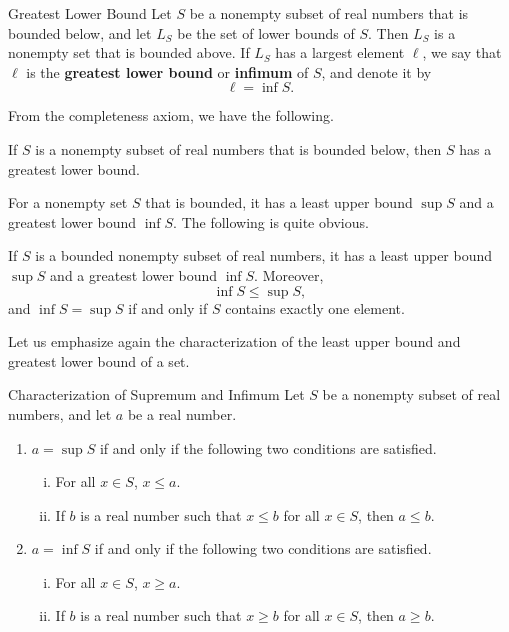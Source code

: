 \begin{definition}{Greatest Lower Bound}
Let $S$ be a nonempty subset of real numbers
 that is bounded below, and let $L_S$ be the set of lower bounds of $S$. Then $L_S$ is a nonempty set that is bounded above. If $L_S$ has a largest element $\ell$, we say that $\ell$ is the {\bf greatest lower bound} or {\bf infimum} of $S$, and denote it by
\[\ell=\inf S.\]
 

\end{definition}

From the completeness axiom, we have the following.
\begin{theorem}{}
If $S$ is a nonempty subset of real numbers
 that is bounded below, then $S$ has a greatest lower bound.
\end{theorem}

For a nonempty set $S$ that is bounded, it has a least upper bound $\sup S$ and a greatest lower bound $\inf S$. The following is quite obvious.

\begin{proposition}{}
If $S$ is a bounded nonempty subset of real numbers, it has a least upper bound $\sup S$ and a greatest lower bound $\inf S$. Moreover,
\[\inf S\leq \sup S,\]
and $\inf S=\sup S$ if and only if $S$ contains exactly one element.
\end{proposition}


Let us emphasize again the characterization of the least upper bound and greatest lower bound of a set.
\begin{highlight}{Characterization of Supremum and Infimum}
Let $S$ be a nonempty subset of real numbers, and let $a$ be a real number.
\begin{enumerate}[1.]
\item$a=\sup S$ if and only if the following two conditions are satisfied.
\begin{enumerate}[(i)]
\item For all $x\in S$, $x\leq a$.
\item If $b$ is a real number such that $x\leq b$ for all $x\in S$, then $a\leq b$.

\end{enumerate}
\item $a=\inf S$ if and only if the following two conditions are satisfied.
\begin{enumerate}[(i)]
\item For all $x\in S$, $x\geq a$.
\item If $b$ is a real number such that $x\geq b$ for all $x\in S$, then $a\geq b$.

\end{enumerate}
\end{enumerate}
\end{highlight}





